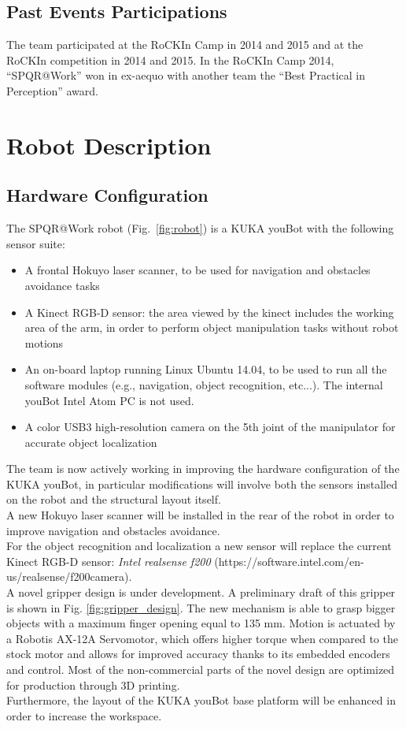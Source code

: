 \documentclass{llncs}
\begin{document}
\subsection{Past Events Participations}

The team participated at the RoCKIn Camp in 2014 and 2015 and at the RoCKIn competition in 2014 and 2015. In the RoCKIn Camp 2014, ``SPQR@Work'' won in ex-aequo with another team the ``Best Practical in Perception'' award.

\section{Robot Description}

\subsection{Hardware Configuration}

The SPQR@Work robot (Fig.~\ref{fig:robot}) is a KUKA youBot with the following sensor suite:

\begin{itemize}
 \item A frontal Hokuyo laser scanner, to be used for navigation and obstacles avoidance tasks
 \item A Kinect RGB-D sensor: the area viewed by the kinect includes the working area of the arm, in order to perform object manipulation tasks without robot motions
 \item An on-board laptop running Linux Ubuntu 14.04, to be used to run all the software modules (e.g., navigation, object recognition, etc...). The internal youBot Intel Atom PC is not used.
 \item A color USB3 high-resolution camera on the 5th joint of the manipulator for accurate object localization
\end{itemize}

The team is now actively working in improving the hardware configuration of the KUKA youBot, in particular modifications will involve both the sensors installed on the robot and the structural layout itself.\\
A new Hokuyo laser scanner will be installed in the rear of the robot in order to improve navigation and obstacles avoidance.\\
For the object recognition and localization a new sensor will replace the current Kinect RGB-D sensor: \emph{Intel realsense f200} (https://software.intel.com/en-us/realsense/f200camera).\\
A novel gripper design is under development. A preliminary draft of this gripper is shown in Fig. \ref{fig:gripper_design}. The new mechanism is able to grasp bigger objects with a maximum finger opening equal to 135 mm. Motion is actuated by a Robotis AX-12A Servomotor, which offers higher torque when compared to the stock motor and allows for improved accuracy thanks to its embedded encoders and control. Most of the non-commercial parts of the novel design are optimized for production through 3D printing.
\\Furthermore, the layout of the KUKA youBot base platform will be enhanced in order to increase the workspace.
\end{document}
